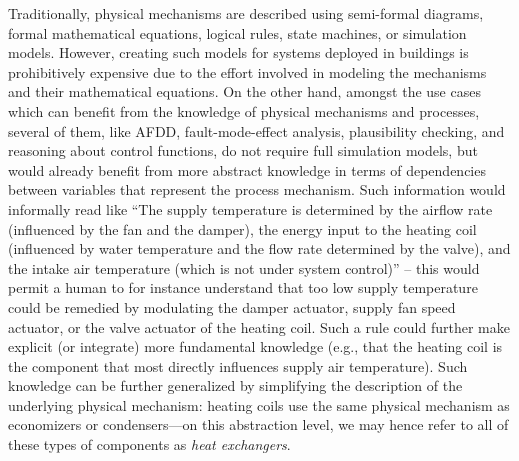 \documentclass[sigconf]{acmart}
\begin{document}

Traditionally, physical mechanisms are described using semi-formal diagrams, formal mathematical equations, logical rules, state machines, or simulation models.
However, creating such models for systems deployed in buildings is prohibitively expensive due to the effort involved in modeling the mechanisms and their mathematical equations.
On the other hand, amongst the use cases which can benefit from the knowledge of physical mechanisms and processes, several of them, like AFDD, fault-mode-effect analysis, plausibility checking, and reasoning about control functions, do not require full simulation models, but would already benefit from more abstract knowledge in terms of dependencies between variables that represent the process mechanism.
%
Such information would informally read like ``The supply temperature is determined by the airflow rate (influenced by the fan and the damper), the energy input to the heating coil (influenced by water temperature and the flow rate determined by the valve), and the intake air temperature (which is not under system control)'' -- this would permit a human to for instance understand that too low supply temperature could be remedied by modulating the damper actuator, supply fan speed actuator, or the valve actuator of the heating coil.
Such a rule could further make explicit (or integrate) more fundamental knowledge (e.g., that the heating coil is the component that most directly influences supply air temperature).
Such knowledge can be further generalized by simplifying the description of the underlying physical mechanism: heating coils use the same physical mechanism as economizers or condensers---on this abstraction level, we may hence refer to all of these types of components as \emph{heat exchangers}.
\end{document}
